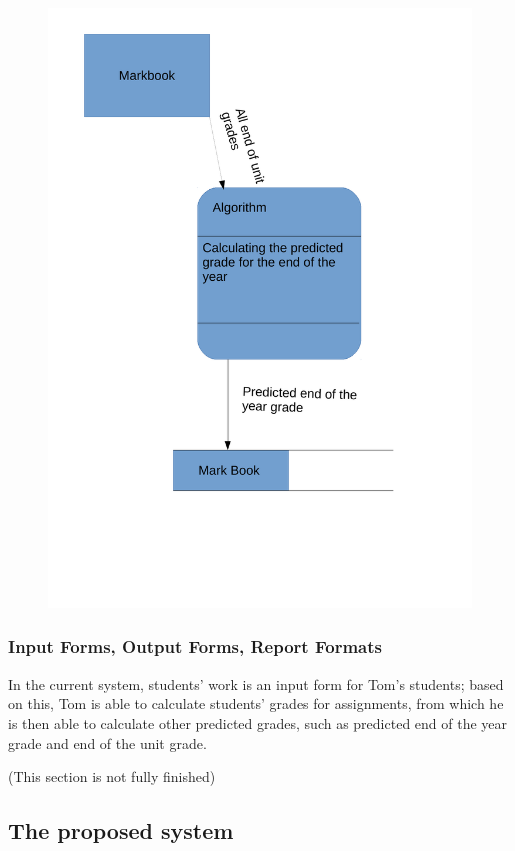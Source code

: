 \begin{figure}[H]
    \includegraphics[width=\textwidth]{./Analysis/images/DataFlowDiagrams2.pdf}
\end{figure}

\subsubsection{Input Forms, Output Forms, Report Formats}

In the current system, students' work is an input form for Tom's students; based on this, Tom is able to calculate students' grades for assignments, from which he is then able to calculate other predicted grades, such as predicted end of the year grade and end of the unit grade.

(This section is not fully finished)

\subsection{The proposed system}

